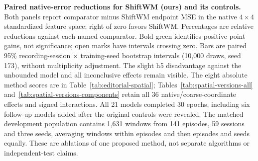 \textbf{Paired native-error reductions for ShiftWM (ours) and its controls.}
Both panels report comparator minus ShiftWM endpoint MSE in the native $4\times4$ standardized feature space; right of zero favors ShiftWM. Percentages are relative reductions against each named comparator. Bold green identifies positive point gains, not significance; open marks have intervals crossing zero. Bars are paired 95\% recording-session $\times$ training-seed bootstrap intervals (10,000 draws, seed 173), without multiplicity adjustment. The slight h5 disadvantage against the unbounded model and all inconclusive effects remain visible. The eight absolute method scores are in Table~\ref{tab:editorial-spatial}; Tables~\ref{tab:spatial-versions-all} and~\ref{tab:spatial-versions-components} retain all 36 native/coarse-coordinate effects and signed interactions. All 21 models completed 30 epochs, including six follow-up models added after the original controls were revealed. The matched development population contains 1,631 windows from 141 episodes, 59 sessions and three seeds, averaging windows within episodes and then episodes and seeds equally. These are ablations of one proposed method, not separate algorithms or independent-test claims.
